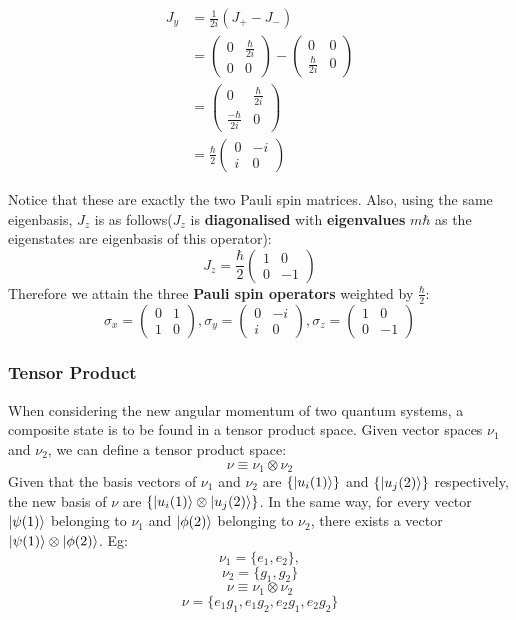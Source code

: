 \documentclass{article}
\begin{document}
\begin{flushleft}
\begin{align*}
J_y&=\frac{1}{2i}(J_+-J_-)\\
&=\begin{pmatrix}
    0&\frac{\hbar}{2i}\\
    0&0
\end{pmatrix}
-
\begin{pmatrix}
    0&0\\
    \frac{\hbar}{2i}&0
\end{pmatrix}\\
&= \begin{pmatrix}
    0&\frac{\hbar}{2i}\\
    \frac{-\hbar}{2i}&0
\end{pmatrix}\\
&=\frac{\hbar}{2}
\begin{pmatrix}
0&-i\\
i&0    
\end{pmatrix}
\end{align*}

Notice that these are exactly the two Pauli spin matrices. Also, using the same eigenbasis, $J_z$ is as follows($J_z$ is \textbf{diagonalised} with \textbf{eigenvalues} $m\hbar$ as the eigenstates are eigenbasis of this operator):
$$J_z=\frac{\hbar}{2}
\begin{pmatrix}
    1&0\\
    0&-1
\end{pmatrix}$$
Therefore we attain the three \textbf{Pauli spin operators} weighted by $\frac{\hbar}{2}$:
$$\sigma_x=
\begin{pmatrix}
0&1\\
1&0    
\end{pmatrix},
\sigma_y=
\begin{pmatrix}
0&-i\\
i&0    
\end{pmatrix},
\sigma_z=
\begin{pmatrix}
    1&0\\
    0&-1
\end{pmatrix}$$

\subsubsection{Tensor Product}

When considering the new angular momentum of two quantum systems, a composite state is to be found in a tensor product space. Given vector spaces $\nu_1$ and $\nu_2$, we can define a tensor product space:
$$\nu\equiv\nu_1\otimes\nu_2$$
Given that the basis vectors of $\nu_1$ and $\nu_2$ are $\{\ket{u_i(1)}\}$ and $\{\ket{u_j(2)}\}$ respectively, the new basis of $\nu$ are $\{\ket{u_i(1)}\otimes\ket{u_j(2)}\}$. In the same way, for every vector $\ket{\psi(1)}$ belonging to $\nu_1$ and $\ket{\phi(2)}$ belonging to $\nu_2$, there exists a vector $\ket{\psi(1)}\otimes\ket{\phi(2)}$. Eg:
$$\nu_1=\{e_1,e_2\},$$
$$\nu_2=\{g_1,g_2\}$$
$$\nu\equiv\nu_1\otimes\nu_2$$
$$\nu=\{e_1g_1,e_1g_2,e_2g_1,e_2g_2\}$$


\end{flushleft}
\end{document}
